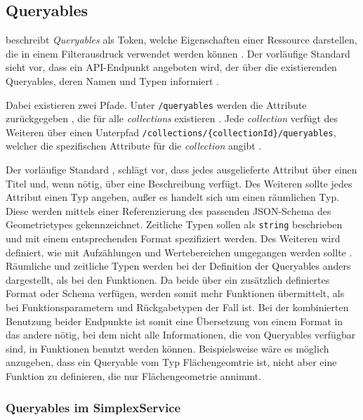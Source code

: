 \subsection{Queryables}
\label{sec:queryables}

 beschreibt \textit{Queryables} als Token, welche Eigenschaften einer Ressource darstellen, die in einem Filterausdruck verwendet werden können . Der vorläufige Standard sieht vor, dass ein \ac{API}-Endpunkt angeboten wird, der über die existierenden Queryables, deren Namen und Typen informiert .

Dabei existieren zwei Pfade. Unter \texttt{/queryables} werden die Attribute zurückgegeben , die für alle \textit{collections} existieren . Jede \textit{collection} verfügt des Weiteren über einen Unterpfad \texttt{/collections/\{collectionId\}/queryables}, welcher die spezifischen Attribute für die \textit{collection} angibt .

\pskip
Der vorläufige Standard , schlägt vor, dass jedes ausgelieferte Attribut über einen Titel und, wenn nötig, über eine Beschreibung verfügt. Des Weiteren sollte jedes Attribut einen Typ angeben, außer es handelt sich um einen räumlichen Typ. Diese werden mittels einer Referenzierung des passenden \ac{JSON}-Schema des Geometrietypes gekennzeichnet. Zeitliche Typen sollen als \texttt{string} beschrieben und mit einem entsprechenden Format spezifiziert werden. Des Weiteren wird definiert, wie mit Aufzählungen und Wertebereichen umgegangen werden sollte . Räumliche und zeitliche Typen werden bei der Definition der Queryables anders dargestellt, als bei den Funktionen. Da beide über ein zusätzlich definiertes Format oder Schema verfügen, werden somit mehr Funktionen übermittelt, als bei Funktionsparametern und Rückgabetypen der Fall ist. Bei der kombinierten Benutzung beider Endpunkte ist somit eine Übersetzung von einem Format in das andere nötig, bei dem nicht alle Informationen, die von Queryables verfügbar sind, in Funktionen benutzt werden können. Beispielsweise wäre es möglich anzugeben, dass ein Queryable vom Typ Flächengeomtrie ist, nicht aber eine Funktion zu definieren, die nur Flächengeometrie annimmt.

\subsubsection{Queryables im SimplexService}

